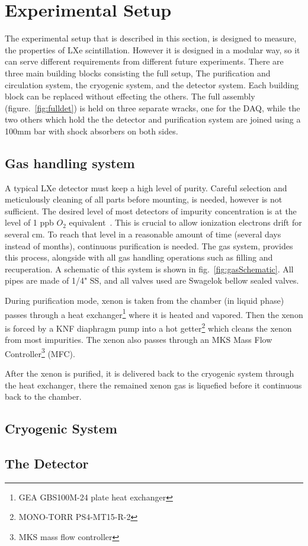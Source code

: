 \section{Experimental Setup}
\label{expSetup}
The experimental setup that is described in this section, is designed to measure, the properties of LXe scintillation. However it is designed in a modular way, so it can serve different requirements from different future experiments. There are three main building blocks consisting the full setup, The purification and circulation system, the cryogenic system, and the detector system. Each building block can be replaced without effecting the others. The full assembly (figure.~\ref{fig:fulldet}) is held on three separate wracks, one for the DAQ, while the two others which hold the the detector and purification system are joined using a 100mm bar with shock absorbers on both sides.   

\subsection{Gas handling system}
\label{subsec:gas}

A typical LXe detector must keep a high level of purity. Careful selection and meticulously cleaning of all parts before mounting, is needed, however is not sufficient. The desired level of most detectors of impurity concentration is at the level of 1 ppb $O_2$ equivalent~\cite{Aprile:2009dv}. This is crucial to allow ionization electrons drift for several cm. To reach that level in a reasonable amount of time (several days instead of months), continuous purification is needed. The gas system, provides this process, alongside with all gas handling operations such as filling and recuperation. A schematic of this system is shown in fig.~\ref{fig:gasSchematic}. All pipes are made of 1/4" SS, and all valves used are Swagelok bellow sealed valves.

During purification mode, xenon is taken from the chamber (in liquid phase)
passes through a heat exchanger\footnote{GEA GBS100M-24 plate heat exchanger} where it is heated and vapored. Then the xenon is forced by a KNF diaphragm pump into a hot getter\footnote{MONO-TORR
PS4-MT15-R-2} which cleans the xenon from most impurities. The xenon
also passes through an MKS Mass Flow Controller\footnote{MKS mass flow controller} (MFC). 

After the xenon is purified, it is delivered back to the cryogenic system through the heat exchanger, there the remained xenon gas is liquefied before it continuous back to the chamber.
 

\subsection{Cryogenic System}
\label{subsec:cryo}

\subsection{The Detector}
\label{subsec:det}
